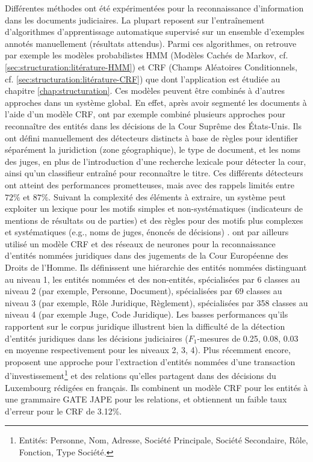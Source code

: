 Différentes méthodes ont été expérimentées pour la reconnaissance d'information dans les documents judiciaires. La plupart reposent sur l'entraînement d'algorithmes d'apprentissage automatique supervisé sur un ensemble d'exemples annotés manuellement (résultats attendus). Parmi ces algorithmes, on retrouve par exemple les modèles probabilistes HMM (Modèles Cachés de Markov, cf. \ref{sec:structuration:litérature-HMM}) et CRF (Champs Aléatoires Conditionnels, cf. \ref{sec:structuration:litérature-CRF}) que dont l'application est étudiée au chapitre \ref{chap:structuration}. Ces modèles peuvent être combinés à d'autres approches dans un système global. En effet, après avoir segmenté les documents à l'aide d'un modèle CRF, \citet{dozier2010legalnerr} ont par exemple combiné plusieurs approches pour reconnaître des entités dans les décisions de la Cour Suprême des États-Unis. Ils ont défini manuellement des détecteurs distincts à base de règles pour identifier séparément la juridiction (zone géographique), le type de document, et les noms des juges, en plus de l'introduction d'une recherche lexicale pour détecter la cour, ainsi qu'un classifieur entraîné pour reconnaître le titre. Ces différents détecteurs ont atteint des performances prometteuses, mais avec des rappels limités entre $ 72 \% $ et $ 87 \% $. Suivant la complexité des éléments à extraire, un système peut exploiter un lexique pour les motifs simples et non-systématiques (indicateurs de mentions de résultats ou de parties) et des règles pour des motifs plus complexes et systématiques (e.g., noms de juges, énoncés de décisions) \citep{Waltl2016lexia,waltl2017legaliegerman, wyner2010extractlegalelts}. \cite{cardellino2017legalNERCL} ont par ailleurs utilisé un modèle CRF et des réseaux de neurones pour la reconnaissance d'entités nommées juridiques dans des jugements de la Cour Européenne des Droits de l'Homme.
Ils définissent une hiérarchie des entités nommées distinguant au niveau 1, les entités nommées et des non-entités,  spécialisées par 6 classes au niveau 2 (par exemple, Personne, Document), spécialisées par 69 classes au niveau 3 (par exemple, Rôle Juridique, Règlement), spécialisées par 358 classes au niveau 4 (par exemple Juge, Code Juridique). Les basses performances qu'ils rapportent sur le corpus juridique illustrent bien la difficulté de la détection d'entités juridiques dans les décisions judiciaires ($F_1$-mesures de 0.25, 0.08, 0.03 en moyenne respectivement pour les niveaux 2, 3, 4). Plus récemment encore, \citet{andrew2018legalNerAndRelation} proposent une approche pour l'extraction d'entités nommées d'une transaction d'investissement\footnote{Entités: Personne, Nom, Adresse, Société Principale, Société Secondaire, Rôle, Fonction, Type Société.} et des relations qu'elles partagent dans des décisions du Luxembourg rédigées en français. Ils combinent un modèle CRF pour les entités à  une grammaire GATE JAPE \citep{thakker2009gatejape} pour les relations, et obtiennent un faible taux d'erreur pour le CRF de 3.12\%. %

